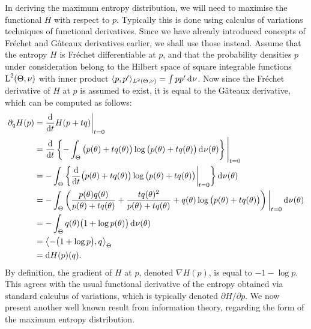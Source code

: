 In deriving the maximum entropy distribution, we will need to maximise the functional $H$ with respect to $p$.
Typically this is done using calculus of variations techniques of functional derivatives.
Since we have already introduced concepts of Fréchet and Gâteaux derivatives earlier, we shall use those instead.
Assume that the entropy $H$ is Fréchet differentiable at $p$, and that the probability densities $p$ under consideration belong to the Hilbert space of square integrable functions $\text{L}^2(\Theta,\nu)$ with inner product $\langle p,p'\rangle_{L^2(\Theta,\nu)} = \int pp' \operatorname{d}\hspace{0.5pt}\!\nu$.
Now since the Fréchet derivative of $H$ at $p$ is assumed to exist, it is equal to the Gâteaux derivative, which can be computed as follows:
\begin{align*}
  \partial_q H(p) 
  &= \frac{\text{d}}{\text{d} t} H(p + tq)  \bigg|_{t=0} \\
  &= \frac{\text{d}}{\text{d} t} \left\{ - \int_\Theta \big(p(\theta) + tq(\theta)\big) \log \big(p(\theta) + tq(\theta)\big) \operatorname{d}\hspace{0.5pt}\!\nu(\theta) \right\} \Bigg|_{t=0} \\
  &= - \int_\Theta \left\{ \frac{\text{d}}{\text{d} t} \big(p(\theta) + tq(\theta)\big) \log \big(p(\theta) + tq(\theta)\big) \bigg|_{t=0} \right\} \operatorname{d}\hspace{0.5pt}\!\nu(\theta)  \\
  &= -\int_\Theta \left( 
    \frac{p(\theta)q(\theta)}{p(\theta)+tq(\theta)}
    + \frac{tq(\theta)^2}{p(\theta) + tq(\theta)}
    + q(\theta)\log\big( p(\theta) + tq(\theta) \big)
    \right)\bigg|_{t=0} \operatorname{d}\hspace{0.5pt}\!\nu(\theta) \\
  &= -\int_\Theta q(\theta)\big(1 + \log p(\theta) \big) \operatorname{d}\hspace{0.5pt}\!\nu(\theta) \\
  &= \left\langle -\big( 1 + \log p \big), q \right\rangle_\Theta \\
  &= \text{d} H(p)(q).   
\end{align*}
By definition, the gradient of $H$ at $p$, denoted $\nabla H(p)$, is equal to $- 1 - \log p$.
This agrees with the usual functional derivative of the entropy obtained via standard calculus of variations, which is typically denoted $\partial H / \partial p$.
We now present another well known result from information theory, regarding the form of the maximum entropy distribution.

